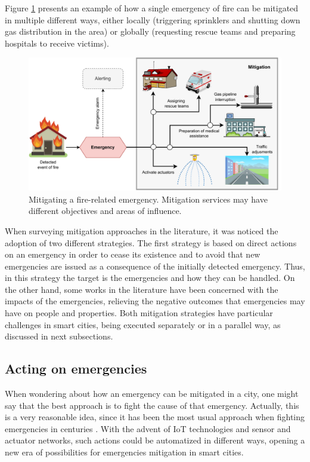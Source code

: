 \begin{refsection}
Figure \ref{Fig:mitigation} presents an example of how a single emergency of fire can be mitigated in multiple different ways, either locally (triggering sprinklers and shutting down gas distribution in the area) or globally (requesting rescue teams and preparing hospitals to receive victims).

\begin{figure}[ht]
  \centering
  \includegraphics[scale=0.45]{Chapters/1-Survey/images/mitigation.pdf}
  \caption{Mitigating a fire-related emergency. Mitigation services may have different objectives and areas of influence.}\label{Fig:mitigation}
\end{figure}

When surveying mitigation approaches in the literature, it was noticed the adoption of two different strategies. The first strategy is based on direct actions on an emergency in order to cease its existence and to avoid that new emergencies are issued as a consequence of the initially detected emergency. Thus, in this strategy the target is the emergencies and how they can be handled. On the other hand, some works in the literature have been concerned with the impacts of the emergencies, relieving the negative outcomes that emergencies may have on people and properties. Both mitigation strategies have particular challenges in smart cities, being executed separately or in a parallel way, as discussed in next subsections. 

\subsection{Acting on emergencies}

When wondering about how an emergency can be mitigated in a city, one might say that the best approach is to fight the cause of that emergency. Actually, this is a very reasonable idea, since it has been the most usual approach when fighting emergencies in centuries \cite{fireevolution,firetemporaldata1}. With the advent of IoT technologies and sensor and actuator networks, such actions could be automatized in different ways, opening a new era of possibilities for emergencies mitigation in smart cities. 


\end{refsection}
